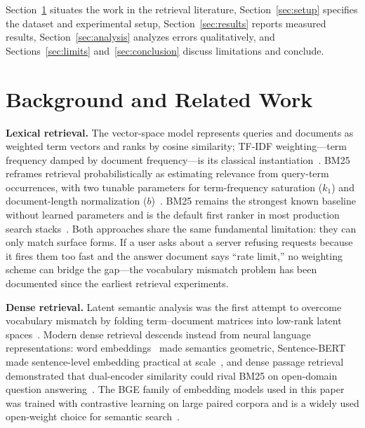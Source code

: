 \documentclass[11pt,a4paper]{article}
\begin{document}
Section~\ref{sec:related} situates the work in the retrieval literature, Section~\ref{sec:setup} specifies the dataset and experimental setup, Section~\ref{sec:results} reports measured results, Section~\ref{sec:analysis} analyzes errors qualitatively, and Sections~\ref{sec:limits} and~\ref{sec:conclusion} discuss limitations and conclude.

\section{Background and Related Work}\label{sec:related}

\textbf{Lexical retrieval.} The vector-space model represents queries and documents as weighted term vectors and ranks by cosine similarity; TF-IDF weighting---term frequency damped by document frequency---is its classical instantiation~\cite{salton1975}. BM25 reframes retrieval probabilistically as estimating relevance from query-term occurrences, with two tunable parameters for term-frequency saturation ($k_1$) and document-length normalization ($b$)~\cite{robertson2009}. BM25 remains the strongest known baseline without learned parameters and is the default first ranker in most production search stacks~\cite{manning2008}. Both approaches share the same fundamental limitation: they can only match surface forms. If a user asks about a server refusing requests because it fires them too fast and the answer document says ``rate limit,'' no weighting scheme can bridge the gap---the vocabulary mismatch problem has been documented since the earliest retrieval experiments.

\textbf{Dense retrieval.} Latent semantic analysis was the first attempt to overcome vocabulary mismatch by folding term--document matrices into low-rank latent spaces~\cite{deerwester1990}. Modern dense retrieval descends instead from neural language representations: word embeddings~\cite{mikolov2013,pennington2014} made semantics geometric, Sentence-BERT made sentence-level embedding practical at scale~\cite{reimers2019}, and dense passage retrieval demonstrated that dual-encoder similarity could rival BM25 on open-domain question answering~\cite{karpukhin2020}. The BGE family of embedding models used in this paper was trained with contrastive learning on large paired corpora and is a widely used open-weight choice for semantic search~\cite{xiao2023}.
\end{document}
